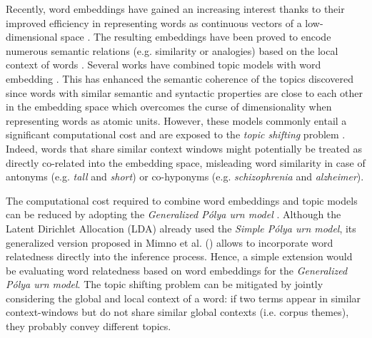 \documentclass[letterpaper]{article}
\begin{document}
Recently, word embeddings have gained an increasing interest thanks to their improved efficiency in representing words as continuous vectors of a low-dimensional space \cite{Mikolov13a,Joulin16}. The resulting embeddings have been proved to encode numerous semantic relations (e.g. similarity or analogies) based on the local context of words \cite{Levy15}. Several works have combined topic models with word embedding \cite{nguyen2015improving,Li16}. This has enhanced the semantic coherence of the topics discovered since words with similar semantic and syntactic properties are close to each other in the embedding space which overcomes the curse of dimensionality when representing words as atomic units. However, these models commonly entail a significant computational cost and are exposed to the \textit{topic shifting} problem \cite{Rekabsaz17}.
Indeed, words that share similar context windows might potentially be treated as directly co-related into the embedding space, misleading word similarity in case of antonyms (e.g. \textit{tall} and \textit{short}) or co-hyponyms (e.g. \textit{schizophrenia} and \textit{alzheimer}).

The computational cost required to combine word embeddings and topic models can be reduced by adopting the \textit{Generalized P\'{o}lya urn model} \cite{Mahmoud08}. Although the Latent Dirichlet Allocation (LDA) \cite{Blei03} already used the \textit{Simple P\'{o}lya urn model}, its generalized version proposed in Mimno et al. (\citeyear{Mimno11}) allows to incorporate word relatedness directly into the inference process. Hence, a simple extension would be evaluating word relatedness based on word embeddings for the \textit{Generalized P\'{o}lya urn model}. %
The topic shifting problem can be mitigated by jointly considering the global and local context of a word: if two terms appear in similar context-windows but do not share similar global contexts (i.e. corpus themes), they probably convey different topics. %
\end{document}
